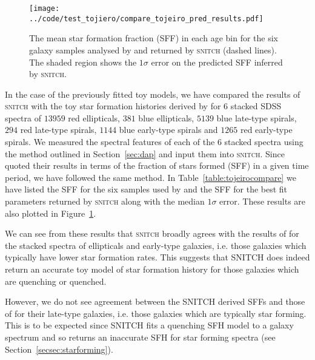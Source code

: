 \documentclass[useAMS,usenatbib]{mn2e}
\begin{document}
\begin{figure}
\centering
\texttt{[image: ../code/test\_tojiero/compare\_tojeiro\_pred\_results.pdf]}
\caption{The mean star formation fraction (SFF) in each age bin for the six galaxy samples analysed by \protect\cite[][solid lines]{tojeiro13} and returned by \textsc{snitch} (dashed lines). The shaded region shows the $1\sigma$ error on the predicted SFF inferred by \textsc{snitch}.}
\label{fig:tojeirocompare}
\end{figure}

In the case of the previously fitted toy models, we have compared the results of \textsc{snitch} with the toy star formation histories derived by \cite{tojeiro13} for $6$ stacked SDSS spectra of $13959$ red ellipticals, $381$ blue ellipticals, $5139$ blue late-type spirals, $294$ red late-type spirals, $1144$ blue early-type spirals and $1265$ red early-type spirals. We measured the spectral features of each of the $6$ stacked spectra using the method outlined in Section~\ref{sec:dap} and input them into \textsc{snitch}. Since \cite{tojeiro13} quoted their results in terms of the fraction of stars formed (SFF) in a given time period, we have followed the same method. In Table~\ref{table:tojeirocompare} we have listed the SFF for the six samples used by \citeauthor{tojeiro13} and the SFF for the best fit parameters returned by \textsc{snitch} along with the median $1\sigma$ error. These results are also plotted in Figure~\ref{fig:tojeirocompare}. 

We can see from these results that \textsc{snitch} broadly agrees with the results of \cite{tojeiro13} for the stacked spectra of ellipticals and early-type galaxies, i.e. those galaxies which typically have lower star formation rates. This suggests that \textsc{SNITCH} does indeed return an accurate toy model of star formation history for those galaxies which are quenching or quenched.  

However, we do not see agreement between the \textsc{SNITCH} derived SFFs and those of \cite{tojeiro13} for their late-type galaxies, i.e. those galaxies which are typically star forming. This is to be expected since \textsc{SNITCH} fits a quenching SFH model to a galaxy spectrum and so returns an inaccurate SFH for star forming spectra (see Section~\ref{secsec:starforming}).   
\end{document}
